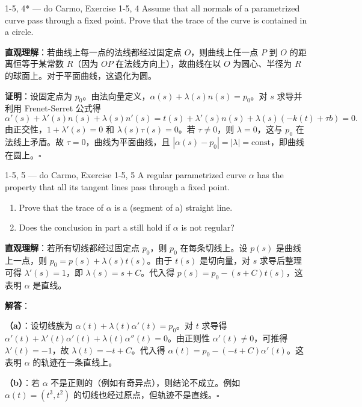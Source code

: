 \begin{exercise}{1-5, 4* — do Carmo, Exercise 1-5, 4}
Assume that all normals of a parametrized curve pass through a fixed point. Prove that the trace of the curve is contained in a circle.
\end{exercise}

\begin{solution}
\textbf{直观理解}：若曲线上每一点的法线都经过固定点 $O$，则曲线上任一点 $P$ 到 $O$ 的距离恒等于某常数 $R$（因为 $OP$ 在法线方向上），故曲线在以 $O$ 为圆心、半径为 $R$ 的球面上。对于平面曲线，这退化为圆。

\textbf{证明}：设固定点为 $p_0$。由法向量定义，$\alpha(s) + \lambda(s)n(s) = p_0$。对 $s$ 求导并利用 Frenet-Serret 公式得
\[
\alpha'(s) + \lambda'(s)n(s) + \lambda(s)n'(s) = t(s) + \lambda'(s)n(s) + \lambda(s)(-k(t) + \tau b) = 0.
\]
由正交性，$1 + \lambda'(s) = 0$ 和 $\lambda(s)\tau(s) = 0$。若 $\tau \neq 0$，则 $\lambda = 0$，这与 $p_0$ 在法线上矛盾。故 $\tau = 0$，曲线为平面曲线，且 $|\alpha(s)-p_0| = |\lambda| = \text{const}$，即曲线在圆上。$\square$
\end{solution}

\begin{exercise}{1-5, 5 — do Carmo, Exercise 1-5, 5}
A regular parametrized curve $\alpha$ has the property that all its tangent lines pass through a fixed point.
\begin{enumerate}
\item[a.] Prove that the trace of $\alpha$ is a (segment of a) straight line.
\item[b.] Does the conclusion in part a still hold if $\alpha$ is not regular?
\end{enumerate}
\end{exercise}

\begin{solution}
\textbf{直观理解}：若所有切线都经过固定点 $p_0$，则 $p_0$ 在每条切线上。设 $p(s)$ 是曲线上一点，则 $p_0 = p(s) + \lambda(s)t(s)$。由于 $t(s)$ 是切向量，对 $s$ 求导后整理可得 $\lambda'(s) = 1$，即 $\lambda(s) = s + C$。代入得 $p(s) = p_0 - (s+C)t(s)$，这表明 $\alpha$ 是直线。

\textbf{解答}：

\textbf{（a）}：设切线族为 $\alpha(t) + \lambda(t)\alpha'(t) = p_0$。对 $t$ 求导得 $\alpha'(t) + \lambda'(t)\alpha'(t) + \lambda(t)\alpha''(t) = 0$。由正则性 $\alpha'(t) \neq 0$，可推得 $\lambda'(t) = -1$，故 $\lambda(t) = -t + C$。代入得 $\alpha(t) = p_0 - (-t+C)\alpha'(t)$。这表明 $\alpha$ 的轨迹在一条直线上。

\textbf{（b）}：若 $\alpha$ 不是正则的（例如有奇异点），则结论不成立。例如 $\alpha(t) = (t^3, t^2)$ 的切线也经过原点，但轨迹不是直线。$\square$
\end{solution}

